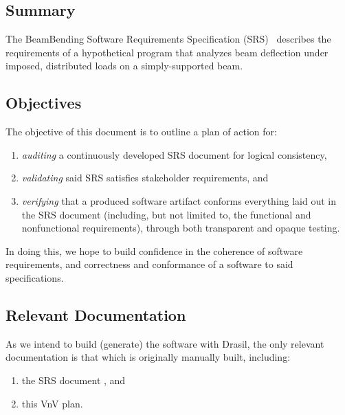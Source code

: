 \documentclass[12pt, titlepage]{article}
\begin{document}
\subsection{Summary}

The BeamBending Software Requirements Specification
(SRS)~\cite{BalaciBeamBendingSRS2023} describes the requirements of a
hypothetical program that analyzes beam deflection under imposed, distributed
loads on a simply-supported beam.

\subsection{Objectives}

The objective of this document is to outline a plan of action for:

\begin{enumerate}

    \item \textit{auditing} a continuously developed SRS document
          \cite{ParnasAndClements1986} for logical consistency,

    \item \textit{validating} said SRS satisfies stakeholder requirements, and

    \item \textit{verifying} that a produced software artifact conforms
          everything laid out in the SRS document (including, but not limited
          to, the functional and nonfunctional requirements), through both
          transparent and opaque testing.

\end{enumerate}

In doing this, we hope to build confidence in the coherence of software
requirements, and correctness and conformance of a software to said
specifications.

\subsection{Relevant Documentation}

As we intend to build (generate) the software with Drasil, the only relevant
documentation is that which is originally manually built, including:

\begin{enumerate}

    \item the SRS document \cite{BalaciBeamBendingSRS2023}, and

    \item this VnV plan.

\end{enumerate}
\end{document}
